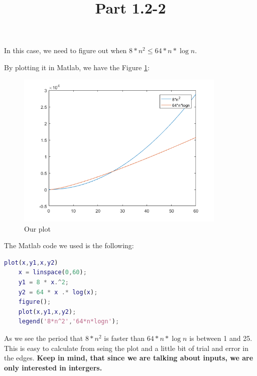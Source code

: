 \documentclass{article}
\title{Part 1.2-2}
\begin{document}
\date{}
\author{}

\maketitle

In this case, we need to figure out when $ 8 * n^{2} \leq 64* n * \log{n} $.

By plotting it in Matlab, we have the Figure \ref{fig:plot1}:

\begin{figure}
    \includegraphics[width=10cm]{images/1-2-2.png}
    \centering
    \caption{Our plot}
    \label{fig:plot1}
\end{figure}

The Matlab code we used is the following:

\begin{lstlisting}[language=Matlab]
    plot(x,y1,x,y2)
    x = linspace(0,60);
    y1 = 8 * x.^2;
    y2 = 64 * x .* log(x);
    figure();
    plot(x,y1,x,y2);
    legend('8*n^2','64*n*logn');
\end{lstlisting}

As we see the period that $8*n^{2}$ is faster than $64*n*\log{n}$ is between 1 and 25. This is easy to calculate from seing the plot and a little bit of trial and error in the edges. \textbf{Keep in mind, that since we are talking about inputs, we are only interested in intergers.}
\end{document}
